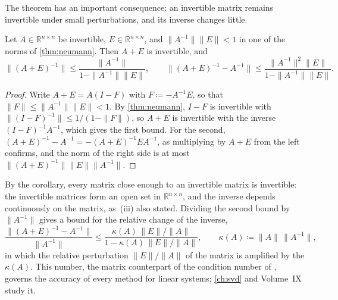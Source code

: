 \begin{figure}
\end{figure}

The theorem has an important consequence: an invertible matrix remains invertible under small perturbations, and its inverse changes little.

\begin{corollary}
\label{cor:perturbed-inverse}
Let $A\in\mathbb R^{n\times n}$ be invertible, $E\in\mathbb R^{n\times n}$, and $\|A^{-1}\|\|E\|<1$ in one of the norms of \cref{thm:neumann}. Then $A+E$ is invertible, and
\[
\bigl\|(A+E)^{-1}\bigr\|\le\frac{\|A^{-1}\|}{1-\|A^{-1}\|\|E\|},\qquad\bigl\|(A+E)^{-1}-A^{-1}\bigr\|\le\frac{\|A^{-1}\|^2\|E\|}{1-\|A^{-1}\|\|E\|}.
\]
\end{corollary}

\begin{proof}
Write $A+E=A(I-F)$ with $F\coloneqq-A^{-1}E$, so that $\|F\|\le\|A^{-1}\|\|E\|<1$. By \cref{thm:neumann}, $I-F$ is invertible with $\|(I-F)^{-1}\|\le1/(1-\|F\|)$, so $A+E$ is invertible with the inverse $(I-F)^{-1}A^{-1}$, which gives the first bound. For the second, $(A+E)^{-1}-A^{-1}=-(A+E)^{-1}EA^{-1}$, as multiplying by $A+E$ from the left confirms, and the norm of the right side is at most $\|(A+E)^{-1}\|\|E\|\|A^{-1}\|$.
\end{proof}

By the corollary, every matrix close enough to an invertible matrix is invertible: the invertible matrices form an open set in $\mathbb R^{n\times n}$, and the inverse depends continuously on the matrix, as \,(iii) also stated. Dividing the second bound by $\|A^{-1}\|$ gives a bound for the relative change of the inverse,
\[
\frac{\|(A+E)^{-1}-A^{-1}\|}{\|A^{-1}\|}\le\frac{\kappa(A)\,\|E\|/\|A\|}{1-\kappa(A)\,\|E\|/\|A\|},\qquad\kappa(A)\coloneqq\|A\|\,\|A^{-1}\|,
\]
in which the relative perturbation $\|E\|/\|A\|$ of the matrix is amplified by the  $\kappa(A)$. This number, the matrix counterpart of the condition number of , governs the accuracy of every method for linear systems; \cref{ch:svd} and Volume~IX study it.

